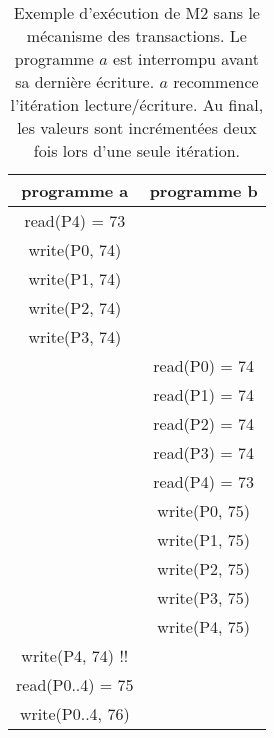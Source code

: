 \documentclass[a4paper,11pt]{article}
\begin{document}
\appendix

\begin{table}
\label{M2}
\caption{Exemple d'exécution de  M2  sans le mécanisme des transactions.
Le programme $a$ est interrompu avant sa dernière écriture. 
$a$ recommence l'itération lecture/écriture.
Au final, les valeurs sont incrémentées deux fois lors d'une seule itération.
}

\begin{center}
\begin{tabular}{|c|c|}
\hline 
programme a & programme b\tabularnewline
\hline 
\hline 
read(P4) = 73 & \tabularnewline
\hline 
write(P0, 74) & \tabularnewline
\hline 
write(P1, 74) & \tabularnewline
\hline 
write(P2, 74) & \tabularnewline
\hline 
write(P3, 74) & \tabularnewline
\hline 
 & read(P0) = 74\tabularnewline
\hline 
 & read(P1) = 74\tabularnewline
\hline 
 & read(P2) = 74\tabularnewline
\hline 
 & read(P3) = 74\tabularnewline
\hline 
 & read(P4) = 73\tabularnewline
\hline 
 & write(P0, 75)\tabularnewline
\hline 
 & write(P1, 75)\tabularnewline
\hline 
 & write(P2, 75)\tabularnewline
\hline 
 & write(P3, 75)\tabularnewline
\hline 
 & write(P4, 75)\tabularnewline
\hline 
write(P4, 74) !! & \tabularnewline
\hline 
read(P0..4) = 75 & \tabularnewline
\hline 
write(P0..4, 76) & \tabularnewline
\hline 
\end{tabular}
\end{center}
\end{table}
\end{document}
